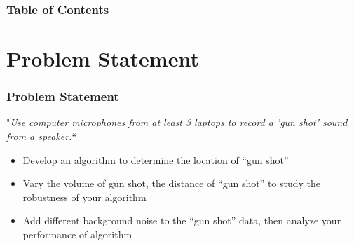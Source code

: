 




%
%

\frame{\titlepage}


%
%

\begin{frame}

	\frametitle{Table of Contents}
	
	\tableofcontents
	
\end{frame}


%
%

\section{Problem Statement}
\begin{frame}

	\frametitle{Problem Statement}
	
	"\textit{Use computer microphones from at least 3 laptops to record a 'gun shot' sound from a speaker.}``

	\begin{itemize}
		\item Develop an algorithm to determine the location of “gun shot”
		\item Vary the volume of gun shot, the distance of “gun shot” to study the robustness of your algorithm
		\item Add different background noise to the “gun shot” data, then analyze your performance of algorithm
	\end{itemize}
	
\end{frame}


%
%

